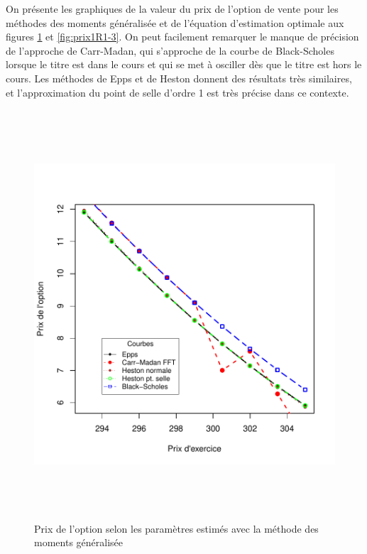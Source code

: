 On présente les graphiques de la valeur du prix de l'option de vente
pour les méthodes des moments généralisée et de l'équation d'estimation
optimale aux figures \ref{fig:prix1R1-1} et \ref{fig:prix1R1-3}.  On
peut facilement remarquer le manque de précision de l'approche de
Carr-Madan, qui s'approche de la courbe de Black-Scholes lorsque le
titre est dans le cours et qui se met à osciller dès que le titre
est hors le cours. Les méthodes de Epps et de Heston donnent des
résultats très similaires, et l'approximation du point de selle
d'ordre 1 est très précise dans ce contexte.
\begin{figure}[!ht]
  \centering
  \includegraphics[height=6in,
  width=6in]{../graphiques/ABBEYN-callGAL-7.pdf}
  \caption{Prix de l'option selon les paramètres estimés avec la
    méthode des moments généralisée}
  \label{fig:prix1R1-1}
\end{figure}

